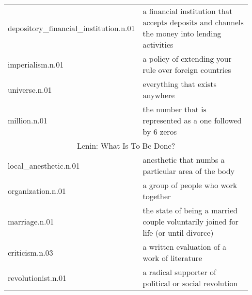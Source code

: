 \begin{table*}[ht]
\begin{tabular}{ p{5cm} p{12cm} }
depository\_financial\_institution.n.01 & a financial institution that accepts deposits and channels the money into lending activities \\
imperialism.n.01 & a policy of extending your rule over foreign countries \\
universe.n.01 & everything that exists anywhere \\
million.n.01 & the number that is represented as a one followed by 6 zeros \\
\midrule  \multicolumn{2}{c}{Lenin: What Is To Be Done?} \\  \midrule
local\_anesthetic.n.01 & anesthetic that numbs a particular area of the body \\
organization.n.01 & a group of people who work together \\
marriage.n.01 & the state of being a married couple voluntarily joined for life (or until divorce) \\
criticism.n.03 & a written evaluation of a work of literature \\
revolutionist.n.01 & a radical supporter of political or social revolution \\
    \bottomrule
\end{tabular}
\end{table*}
